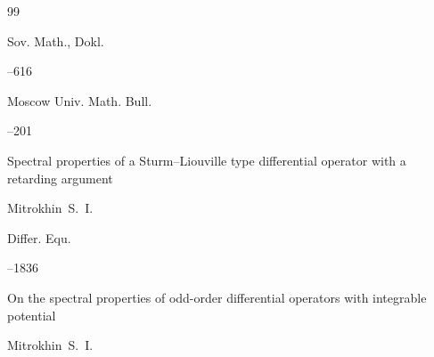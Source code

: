 \begin{thebibliography}{99}

\jour Sov. Math., Dokl. 


--616 





\jour Moscow Univ. Math. Bull. 






--201

\paper  Spectral properties of a Sturm--Liouville type differential operator with a retarding argument

\by Mitrokhin~S.~I. 




\jour Differ. Equ.







--1836

\paper On the spectral properties of odd-order differential operators with integrable potential

\by Mitrokhin~S.~I. 



\end{thebibliography}







\renewcommand{\baselinestretch}{0.9}



%

